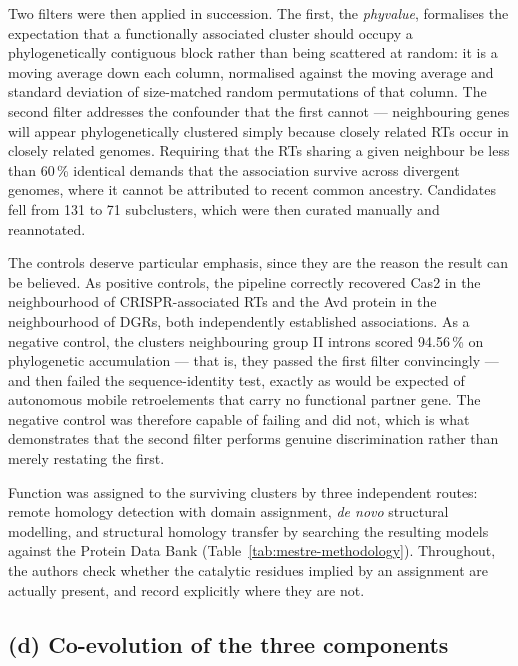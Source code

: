 Two filters were then applied in succession. The first, the \textit{phyvalue}, formalises the
expectation that a functionally associated cluster should occupy a phylogenetically contiguous
block rather than being scattered at random: it is a moving average down each column, normalised
against the moving average and standard deviation of size-matched random permutations of that
column. The second filter addresses the confounder that the first cannot --- neighbouring genes
will appear phylogenetically clustered simply because closely related RTs occur in closely related
genomes. Requiring that the RTs sharing a given neighbour be less than 60\,\% identical demands
that the association survive across divergent genomes, where it cannot be attributed to recent
common ancestry. Candidates fell from 131 to 71 subclusters, which were then curated manually and
reannotated.
 
The controls deserve particular emphasis, since they are the reason the result can be believed. As
positive controls, the pipeline correctly recovered Cas2 in the neighbourhood of CRISPR-associated
RTs and the Avd protein in the neighbourhood of DGRs, both independently established
associations. As a negative control, the clusters neighbouring group II introns scored 94.56\,\%
on phylogenetic accumulation --- that is, they passed the first filter convincingly --- and then
failed the sequence-identity test, exactly as would be expected of autonomous mobile retroelements
that carry no functional partner gene. The negative control was therefore capable of failing and
did not, which is what demonstrates that the second filter performs genuine discrimination rather
than merely restating the first.
 
Function was assigned to the surviving clusters by three independent routes: remote homology
detection with domain assignment, \textit{de novo} structural modelling, and structural homology
transfer by searching the resulting models against the Protein Data Bank
(Table~\ref{tab:mestre-methodology}). Throughout, the authors check whether the catalytic residues
implied by an assignment are actually present, and record explicitly where they are not.


\subsection{(d) Co-evolution of the three components}
 
